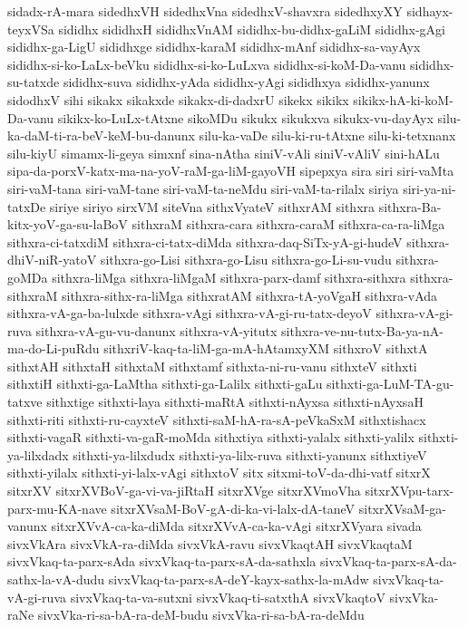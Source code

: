 {sidadx-rA-mara
sidedhxVH
sidedhxVna
sidedhxV-shavxra
sidedhxyXY
sidhayx-teyxVSa
sididhx
sididhxH
sididhxVnAM
sididhx-bu-didhx-gaLiM
sididhx-gAgi
sididhx-ga-LigU
sididhxge
sididhx-karaM
sididhx-mAnf
sididhx-sa-vayAyx
sididhx-si-ko-LaLx-beVku
sididhx-si-ko-LuLxva
sididhx-si-koM-Da-vanu
sididhx-su-tatxde
sididhx-suva
sididhx-yAda
sididhx-yAgi
sididhxya
sididhx-yanunx
sidodhxV
sihi
sikakx
sikakxde
sikakx-di-dadxrU
sikekx
sikikx
sikikx-hA-ki-koM-Da-vanu
sikikx-ko-LuLx-tAtxne
sikoMDu
sikukx
sikukxva
sikukx-vu-dayAyx
silu-ka-daM-ti-ra-beV-keM-bu-danunx
silu-ka-vaDe
silu-ki-ru-tAtxne
silu-ki-tetxnanx
silu-kiyU
simamx-li-geya
simxnf
sina-nAtha
siniV-vAli
siniV-vAliV
sini-hALu
sipa-da-porxV-katx-ma-na-yoV-raM-ga-liM-gayoVH
sipepxya
sira
siri
siri-vaMta
siri-vaM-tana
siri-vaM-tane
siri-vaM-ta-neMdu
siri-vaM-ta-rilalx
siriya
siri-ya-ni-tatxDe
siriye
siriyo
sirxVM
siteVna
sithxVyateV
sithxrAM
sithxra
sithxra-Ba-kitx-yoV-ga-su-laBoV
sithxraM
sithxra-cara
sithxra-caraM
sithxra-ca-ra-liMga
sithxra-ci-tatxdiM
sithxra-ci-tatx-diMda
sithxra-daq-SiTx-yA-gi-hudeV
sithxra-dhiV-niR-yatoV
sithxra-go-Lisi
sithxra-go-Lisu
sithxra-go-Li-su-vudu
sithxra-goMDa
sithxra-liMga
sithxra-liMgaM
sithxra-parx-damf
sithxra-sithxra
sithxra-sithxraM
sithxra-sithx-ra-liMga
sithxratAM
sithxra-tA-yoVgaH
sithxra-vAda
sithxra-vA-ga-ba-lulxde
sithxra-vAgi
sithxra-vA-gi-ru-tatx-deyoV
sithxra-vA-gi-ruva
sithxra-vA-gu-vu-danunx
sithxra-vA-yitutx
sithxra-ve-nu-tutx-Ba-ya-nA-ma-do-Li-puRdu
sithxriV-kaq-ta-liM-ga-mA-hAtamxyXM
sithxroV
sithxtA
sithxtAH
sithxtaH
sithxtaM
sithxtamf
sithxta-ni-ru-vanu
sithxteV
sithxti
sithxtiH
sithxti-ga-LaMtha
sithxti-ga-Lalilx
sithxti-gaLu
sithxti-ga-LuM-TA-gu-tatxve
sithxtige
sithxti-laya
sithxti-maRtA
sithxti-nAyxsa
sithxti-nAyxsaH
sithxti-riti
sithxti-ru-cayxteV
sithxti-saM-hA-ra-sA-peVkaSxM
sithxtishacx
sithxti-vagaR
sithxti-va-gaR-moMda
sithxtiya
sithxti-yalalx
sithxti-yalilx
sithxti-ya-lilxdadx
sithxti-ya-lilxdudx
sithxti-ya-lilx-ruva
sithxti-yanunx
sithxtiyeV
sithxti-yilalx
sithxti-yi-lalx-vAgi
sithxtoV
sitx
sitxmi-toV-da-dhi-vatf
sitxrX
sitxrXV
sitxrXVBoV-ga-vi-va-jiRtaH
sitxrXVge
sitxrXVmoVha
sitxrXVpu-tarx-parx-mu-KA-nave
sitxrXVsaM-BoV-gA-di-ka-vi-lalx-dA-taneV
sitxrXVsaM-ga-vanunx
sitxrXVvA-ca-ka-diMda
sitxrXVvA-ca-ka-vAgi
sitxrXVyara
sivada
sivxVkAra
sivxVkA-ra-diMda
sivxVkA-ravu
sivxVkaqtAH
sivxVkaqtaM
sivxVkaq-ta-parx-sAda
sivxVkaq-ta-parx-sA-da-sathxla
sivxVkaq-ta-parx-sA-da-sathx-la-vA-dudu
sivxVkaq-ta-parx-sA-deY-kayx-sathx-la-mAdw
sivxVkaq-ta-vA-gi-ruva
sivxVkaq-ta-va-sutxni
sivxVkaq-ti-satxthA
sivxVkaqtoV
sivxVka-raNe
sivxVka-ri-sa-bA-ra-deM-budu
sivxVka-ri-sa-bA-ra-deMdu
}

